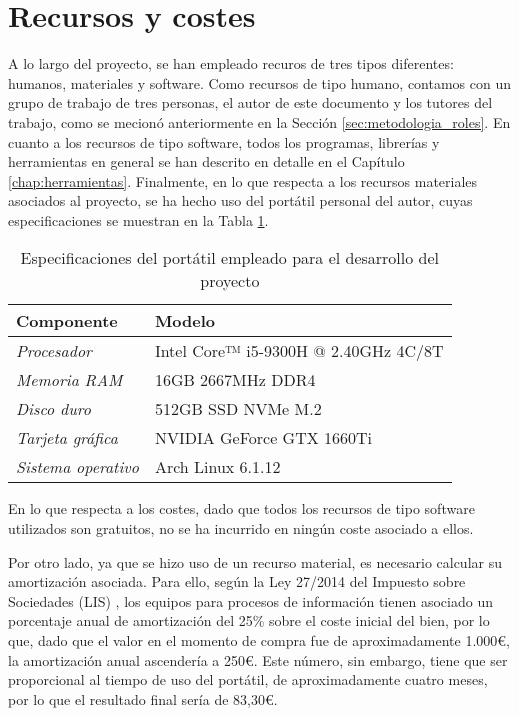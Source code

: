 \section{Recursos y costes}
\label{sec:planificacion_costes}

A lo largo del proyecto, se han empleado recuros de tres tipos diferentes: humanos, materiales y software.
Como recursos de tipo humano,
contamos con un grupo de trabajo de tres personas, el autor de este documento y los tutores del trabajo, 
como se mecionó anteriormente en la Sección \ref{sec:metodologia_roles}.
En cuanto a los recursos de tipo software, todos los programas, librerías y herramientas en general
se han descrito en detalle en el Capítulo \ref{chap:herramientas}.
Finalmente, en lo que respecta a los recursos materiales asociados al proyecto, se ha hecho uso del portátil personal del autor, 
cuyas especificaciones se muestran en la Tabla \ref{tab:costes_hardware}.

\bigskip
\begin{table}[H]
	\centering
	\begin{tabular}{|l|l|}
		\rowcolor{udcpink!25}
		\hline
		\small \textbf{Componente} & \small \textbf{Modelo} \\ \hline
		\small \textit{Procesador} & \small Intel Core™ i5-9300H @ 2.40GHz 4C/8T \\ \hline
		\small \textit{Memoria RAM} & \small 16GB 2667MHz DDR4 \\ \hline
		\small \textit{Disco duro} & \small 512GB SSD NVMe M.2 \\ \hline
		\small \textit{Tarjeta gráfica} & \small NVIDIA GeForce GTX 1660Ti \\ \hline
		\small \textit{Sistema operativo} & \small Arch Linux 6.1.12 \\ \hline
	\end{tabular}
	\caption{Especificaciones del portátil empleado para el desarrollo del proyecto}
	\label{tab:costes_hardware}
\end{table}

\bigskip
En lo que respecta a los costes, dado que todos los recursos de tipo software utilizados son gratuitos, no se ha incurrido en ningún coste
asociado a ellos.

\bigskip
Por otro lado, ya que se hizo uso de un recurso material,
es necesario calcular su amortización asociada. Para ello, según la Ley 27/2014 del Impuesto sobre Sociedades (LIS) \cite{leysociedades},
los equipos para procesos de información tienen asociado un porcentaje anual de amortización del 25\% sobre el coste inicial del bien,
por lo que, dado que el valor en el momento de compra fue de aproximadamente 1.000€, la amortización anual ascendería a 250€. Este número, sin embargo,
tiene que ser proporcional al tiempo de uso del portátil, de aproximadamente cuatro meses, por lo que el resultado final sería de 83,30€.

